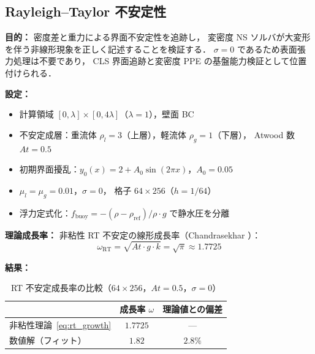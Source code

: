 \subsection{Rayleigh--Taylor 不安定性}
\label{sec:val_rt}
\label{sec:bench_rt}

\noindent\textbf{目的：}
密度差と重力による界面不安定性を追跡し，
変密度 NS ソルバが大変形を伴う非線形現象を正しく記述することを検証する．
$\sigma = 0$ であるため表面張力処理は不要であり，
CLS 界面追跡と変密度 PPE の基盤能力検証として位置付けられる．

\noindent\textbf{設定：}
\begin{itemize}[noitemsep]
  \item 計算領域 $[0, \lambda] \times [0, 4\lambda]$（$\lambda = 1$），壁面 BC
  \item 不安定成層：重流体 $\rho_l = 3$（上層），軽流体 $\rho_g = 1$（下層），
        Atwood 数 $At = 0.5$
  \item 初期界面擾乱：$y_0(x) = 2 + A_0\sin(2\pi x)$，$A_0 = 0.05$
  \item $\mu_l = \mu_g = 0.01$，$\sigma = 0$，
        格子 $64 \times 256$（$h = 1/64$）
  \item 浮力定式化：$f_{\mathrm{buoy}} = -(\rho - \rho_{\mathrm{ref}})/\rho \cdot g$
        で静水圧を分離
\end{itemize}

\noindent\textbf{理論成長率：}
非粘性 RT 不安定の線形成長率（Chandrasekhar \cite{Chandrasekhar1961}）：
\begin{equation}
  \omega_{\mathrm{RT}} = \sqrt{At \cdot g \cdot k}
  = \sqrt{\pi} \approx 1.7725
  \label{eq:rt_growth}
\end{equation}

\noindent\textbf{結果：}

\begin{table}[htbp]
\centering
\caption{RT 不安定成長率の比較（$64 \times 256$，$At = 0.5$，$\sigma = 0$）}
\label{tab:rt_growth}
\renewcommand{\arraystretch}{1.3}
\begin{tabular}{lcc}
\toprule
 & 成長率 $\omega$ & 理論値との偏差 \\
\midrule
非粘性理論~\eqref{eq:rt_growth} & $1.7725$ & --- \\
数値解（フィット） & $1.82$ & $2.8\%$ \\
\bottomrule
\end{tabular}
\end{table}

